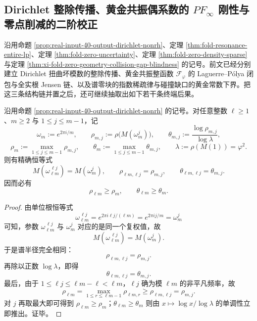 \subsection{Dirichlet 整除传播、黄金共振偶系数的 \texorpdfstring{$PF_\infty$}{PF∞} 刚性与零点削减的二阶校正}\label{subsec:conclusion-dirichlet-divisibility-pf-zero-reduction-second-order}
沿用命题 \ref{prop:real-input-40-output-dirichlet-nonrh}、定理 \ref{thm:fold-resonance-entire-lp}、定理 \ref{thm:fold-zero-uncertainty}、定理 \ref{thm:fold-zero-density-sparse} 与定理 \ref{thm:xi-fold-zero-geometry-collision-gap-blindness} 的记号。前文已经分别建立 Dirichlet 扭曲坏模数的整除传播、黄金共振整函数 \(\mathcal F_\varphi\) 的 Laguerre--P\'olya 闭包与全实根 Jensen 链、以及谱零块的指数稀疏律与碰撞缺口的黄金常数下界。把这三条结构链并置之后，还可继续抽取出如下若干条终端后果。

\begin{theorem}\label{thm:conclusion-dirichlet-twist-divisibility-lift-monotone}
沿用命题 \ref{prop:real-input-40-output-dirichlet-nonrh} 的记号。对任意整数 \(\ell\ge 1\)、\(m\ge 2\) 与 \(1\le j\le m-1\)，记
\[
\omega_m:=e^{2\pi i/m},
\qquad
\rho_{m,j}:=\rho\!\bigl(M(\omega_m^j)\bigr),
\qquad
\theta_{m,j}:=\frac{\log \rho_{m,j}}{\log\lambda},
\]
\[
\rho_m:=\max_{1\le j\le m-1}\rho_{m,j},
\qquad
\theta_m:=\max_{1\le j\le m-1}\theta_{m,j},
\qquad
\lambda:=\rho(M(1))=\varphi^2.
\]
则有精确恒等式
\[
M(\omega_{\ell m}^{\,\ell j})=M(\omega_m^j),
\qquad
\rho_{\ell m,\ell j}=\rho_{m,j},
\qquad
\theta_{\ell m,\ell j}=\theta_{m,j}.
\]
因而必有
\[
\rho_{\ell m}\ge \rho_m,
\qquad
\theta_{\ell m}\ge \theta_m.
\]
\end{theorem}
\begin{proof}
由单位根恒等式
\[
\omega_{\ell m}^{\,\ell j}
=
e^{2\pi i\ell j/(\ell m)}
=
e^{2\pi ij/m}
=
\omega_m^j
\]
可知，参数 \(\omega_{\ell m}^{\,\ell j}\) 与 \(\omega_m^j\) 对应的是同一个复权值，故
\[
M(\omega_{\ell m}^{\,\ell j})=M(\omega_m^j).
\]
于是谱半径完全相同：
\[
\rho_{\ell m,\ell j}=\rho_{m,j}.
\]
再除以正数 \(\log\lambda\)，即得
\[
\theta_{\ell m,\ell j}=\theta_{m,j}.
\]
最后，由于 \(1\le \ell j\le \ell m-\ell<\ell m\)，\(\ell j\) 确为模 \(\ell m\) 的非平凡频率，故
\[
\rho_{\ell m}
=
\max_{1\le r\le \ell m-1}\rho_{\ell m,r}
\ge
\rho_{\ell m,\ell j}
=
\rho_{m,j}.
\]
对 \(j\) 再取最大即可得到 \(\rho_{\ell m}\ge \rho_m\)；\(\theta_{\ell m}\ge \theta_m\) 则由 \(x\mapsto \log x/\log\lambda\) 的单调性立即推出。证毕。
\end{proof}

